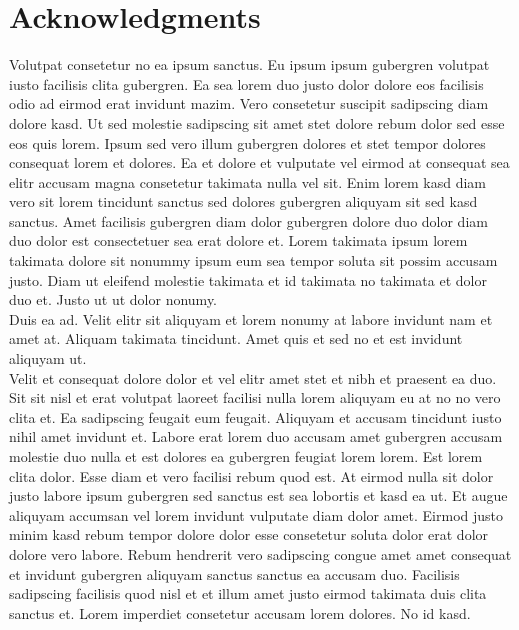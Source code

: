 \documentclass[a4paper,11pt]{article}
\begin{document}
\section*{Acknowledgments}
%
\begin{center}
    Volutpat consetetur no ea ipsum sanctus. Eu ipsum ipsum gubergren volutpat iusto facilisis clita gubergren. Ea sea lorem duo justo dolor dolore eos facilisis odio ad eirmod erat invidunt mazim. Vero consetetur suscipit sadipscing diam dolore kasd. Ut sed molestie sadipscing sit amet stet dolore rebum dolor sed esse eos quis lorem. Ipsum sed vero illum gubergren dolores et stet tempor dolores consequat lorem et dolores. Ea et dolore et vulputate vel eirmod at consequat sea elitr accusam magna consetetur takimata nulla vel sit. Enim lorem kasd diam vero sit lorem tincidunt sanctus sed dolores gubergren aliquyam sit sed kasd sanctus. Amet facilisis gubergren diam dolor gubergren dolore duo dolor diam duo dolor est consectetuer sea erat dolore et. Lorem takimata ipsum lorem takimata dolore sit nonummy ipsum eum sea tempor soluta sit possim accusam justo. Diam ut eleifend molestie takimata et id takimata no takimata et dolor duo et. Justo ut ut dolor nonumy. \\
%
    Duis ea ad. Velit elitr sit aliquyam et lorem nonumy at labore invidunt nam et amet at. Aliquam takimata tincidunt. Amet quis et sed no et est invidunt aliquyam ut. \\
%
    Velit et consequat dolore dolor et vel elitr amet stet et nibh et praesent ea duo. Sit sit nisl et erat volutpat laoreet facilisi nulla lorem aliquyam eu at no no vero clita et. Ea sadipscing feugait eum feugait. Aliquyam et accusam tincidunt iusto nihil amet invidunt et. Labore erat lorem duo accusam amet gubergren accusam molestie duo nulla et est dolores ea gubergren feugiat lorem lorem. Est lorem clita dolor. Esse diam et vero facilisi rebum quod est. At eirmod nulla sit dolor justo labore ipsum gubergren sed sanctus est sea lobortis et kasd ea ut. Et augue aliquyam accumsan vel lorem invidunt vulputate diam dolor amet. Eirmod justo minim kasd rebum tempor dolore dolor esse consetetur soluta dolor erat dolor dolore vero labore. Rebum hendrerit vero sadipscing congue amet amet consequat et invidunt gubergren aliquyam sanctus sanctus ea accusam duo. Facilisis sadipscing facilisis quod nisl et et illum amet justo eirmod takimata duis clita sanctus et. Lorem imperdiet consetetur accusam lorem dolores. No id kasd. \\
\end{center}
%
\newpage
\end{document}

